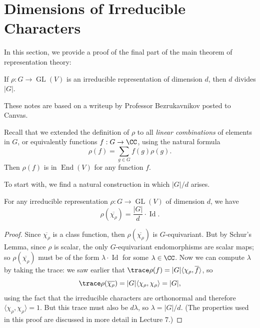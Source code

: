 
\rhead{\rightmark}

\section{Dimensions of Irreducible Characters}

In this section, we provide a proof of the final part of the main theorem of representation theory:

\begin{theorem} \label{final part of thm}
If $\rho : G \to \operatorname{GL}(V)$ is an irreducible representation of dimension $d$, then $d$ divides $|G|$. 
\end{theorem}

These notes are based on a writeup by Professor Bezrukavnikov posted to Canvas. 

Recall that we extended the definition of $\rho$ to all \emph{linear combinations} of elements in $G$, or equivalently functions $f : G \to \CC$, using the natural formula \[\rho(f) = \sum_{g \in G} f(g)\rho(g).\] Then $\rho(f)$ is in $\operatorname{End}(V)$ for any function $f$. 

To start with, we find a natural construction in which $|G|/d$ arises. 

\begin{proposition}
    For any irreducible representation $\rho : G \to \operatorname{GL}(V)$ of dimension $d$, we have  \[\rho(\overline{\chi_\rho}) = \frac{|G|}{d} \cdot \operatorname{Id}.\] 
\end{proposition}

\begin{proof}
    Since $\overline{\chi_\rho}$ is a class function, then $\rho(\overline{\chi_\rho})$ is $G$-equivariant. But by Schur's Lemma, since $\rho$ is scalar, the only $G$-equivariant endomorphisms are scalar maps; so $\rho(\overline{\chi_\rho})$ must be of the form $\lambda\cdot \operatorname{Id}$ for some $\lambda \in \CC$. Now we can compute $\lambda$ by taking the trace: we saw earlier that $\trace \rho(f) = |G|\langle \chi_\rho, \overline{f}\rangle$, so \[\trace \rho(\overline{\chi_\rho}) = |G|\langle \chi_\rho, \chi_\rho \rangle = |G|,\] using the fact that the irreducible characters are orthonormal and therefore $\langle \chi_\rho, \chi_\rho \rangle = 1$. But this trace must also be $d\lambda$, so $\lambda = |G|/d$. (The properties used in this proof are discussed in more detail in Lecture $7$.)
\end{proof}

